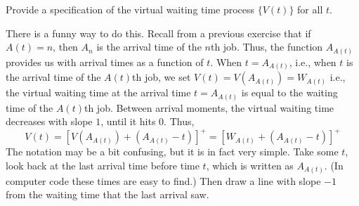 \begin{question}
  Provide a specification of the virtual waiting time process $\{V(t)\}$ for
    all $t$.


    \begin{solution}
      There is a funny way to do this. Recall from a previous exercise
      that if $A(t)=n$, then $A_n$ is the arrival time of the $n$th
      job. Thus, the function $A_{A(t)}$ provides us with arrival
      times as a function of $t$. When $t=A_{A(t)}$, i.e., when $t$ is
      the arrival time of the $A(t)$th job, we set
      $V(t) = V(A_{A(t)}) = W_{A(t)}$ i.e., the virtual waiting time
      at the arrival time $t=A_{A(t)}$ is equal to the waiting time of
      the $A(t)$th job. Between arrival moments, the virtual waiting
      time decreases with slope $1$, until it hits 0.  Thus,
      \begin{equation*}
        V(t) 
= [V(A_{A(t)}) + (A_{A(t)}-t)]^+= [W_{A(t)} + (A_{A(t)}-t)]^+
      \end{equation*}
      The notation may be a bit confusing, but it is in fact very
      simple. Take some $t$, look back at the last arrival time before
      time $t$, which is written as $A_{A(t)}$. (In computer code these
      times are easy to find.) Then draw a line with slope $-1$ from
      the waiting time that the last arrival saw.
    \end{solution}
\end{question}




